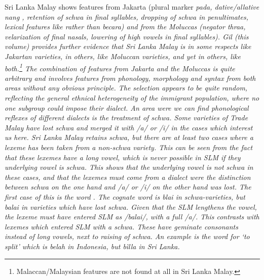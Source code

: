 Sri Lanka Malay shows features from Jakarta (plural marker \em pada\em, dative/allative \em nang \em, retention of schwa in final syllables, dropping of schwa in penultimates, lexical features like  rather than \em becara\em) and from the Moluccas (negator \em thraa\em, velarization of final nasals, lowering of high vowels in final syllables). Gil (this volume) provides further evidence that Sri Lanka Malay is in some respects like Jakartan varieties, in others, like Moluccan varieties, and yet in others, like both.\footnote{Malaccan/Malaysian 
 features are not found at all in Sri Lanka Malay.
} 
The combination of features from Jakarta and the Moluccas is quite arbitrary and involves features from phonology, morphology and syntax from both areas without any obvious principle. The selection appears to be quite random, reflecting the general ethnical heterogeneity of the immigrant population, where no one subgroup could impose their dialect. 
An area were we can find phonological reflexes of different dialects is the treatment of schwa. Some varieties of Trade Malay have lost schwa and merged it with /a/ or /i/ in the cases which interest us here. Sri Lanka Malay retains schwa, but there are at least two cases where a lexeme has been taken from a non-schwa variety. This can be seen from the fact that these lexemes have a long vowel, which is never possible in SLM if they underlying vowel is schwa. This shows that the underlying vowel is not schwa in these cases, and that the lexemes must come from a dialect were the distinction between schwa on the one hand and /a/ or /i/ on the other hand was lost. The first case of this is the word . The cognate word is \em b\E{}lai \em in schwa-varieties, but \em balai \em in varieties which have lost schwa. Given that the SLM lengthens the vowel, the lexeme must have entered SLM as /balai/, with a full /a/. This contrasts with lexemes which entered SLM with a schwa. These have geminate consonants instead of long vowels, next to raising of schwa. An example is the word for `to split' which is \em belah \em in Indonesia, but \em bìlla \em in Sri Lanka.

